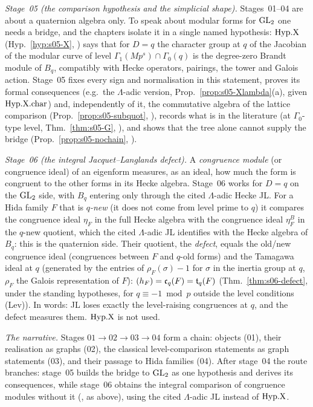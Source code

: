 \emph{Stage~05 (the comparison hypothesis and the simplicial shape).} Stages~01--04 are about a
quaternion algebra only. To speak about modular forms for $\mathrm{GL}_2$ one needs a bridge, and the chapters isolate it in a single
named hypothesis: $\mathrm{Hyp.X}$ (Hyp.~\ref{hyp:s05-X}, \sthyp) says that for $D=q$ the character group at $q$ of the Jacobian of the
modular curve of level $\Gamma_1(Mp^s)\cap\Gamma_0(q)$ is the degree-zero Brandt module of $B_q$, compatibly with Hecke
operators, pairings, the tower and Galois action. Stage~05 fixes every sign and normalisation in this statement, proves its formal
consequences (e.g.\ the $\Lambda$-adic version, Prop.~\ref{prop:s05-Xlambda}(a), \stproved{} given $\mathrm{Hyp.X.char}$) and, independently
of it, the commutative algebra of the lattice comparison (Prop.~\ref{prop:s05-subquot}, \stproved), records what is in the literature (at $\Gamma_0$-type level,
Thm.~\ref{thm:s05-G}, \stcited), and shows that the tree alone cannot supply the bridge (Prop.~\ref{prop:s05-nochain}, \stproved).

\emph{Stage~06 (the integral Jacquet--Langlands defect).} A \emph{congruence module} (or congruence
ideal) of an eigenform measures, as an ideal, how much the form is congruent to the other forms in its Hecke algebra. Stage~06
works for $D=q$ on the $\mathrm{GL}_2$ side, with $B_q$ entering only through the cited $\Lambda$-adic Hecke JL. For a Hida family $F$
that is \emph{$q$-new} (it does not come from level prime to $q$) it compares the congruence ideal $\eta_F$ in the full Hecke
algebra with the congruence ideal $\eta^B_F$ in the $q$-new quotient, which the cited $\Lambda$-adic JL identifies with the Hecke
algebra of $B_q$: this is the quaternion side. Their quotient, the \emph{defect}, equals the old/new congruence ideal (congruences
between $F$ and $q$-old forms) and the Tamagawa ideal at $q$ (generated by the entries of $\rho_F(\sigma)-1$ for $\sigma$ in the
inertia group at $q$, $\rho_F$ the Galois representation of $F$):
$(h_F)=\mathfrak{c}_q(F)=\mathfrak{t}_q(F)$ (Thm.~\ref{thm:s06-defect}, \stpmc{} under the standing hypotheses, \stopen{} for $q\equiv-1\bmod p$
outside the level conditions (Lev)). In words: JL loses exactly the level-raising congruences at $q$, and the defect measures them. $\mathrm{Hyp.X}$ is not
used.

\emph{The narrative.} Stages $01\to02\to03\to04$ form a chain: objects (01), their realisation as graphs (02), the classical
level-comparison statements as graph statements (03), and their passage to Hida families (04). After stage~04 the route branches:
stage~05 builds the bridge to $\mathrm{GL}_2$ as one hypothesis and derives its consequences, while stage~06 obtains the integral
comparison of congruence modules without it (\stpmc, as above), using the cited $\Lambda$-adic JL instead of $\mathrm{Hyp.X}$.

